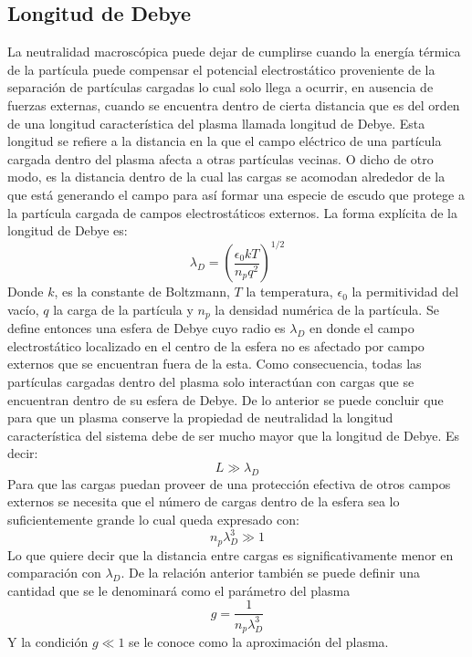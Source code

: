 \documentclass[../tesis_main_file.tex]{subfiles}
\begin{document}
\subsection{Longitud de Debye}
La neutralidad macroscópica puede dejar de cumplirse cuando la energía térmica de la partícula puede compensar el potencial electrostático proveniente de la separación de partículas cargadas lo cual solo llega a ocurrir, en ausencia de fuerzas externas, cuando se encuentra dentro de cierta distancia que es del orden de una longitud característica del plasma llamada longitud de Debye.
Esta longitud se refiere a la distancia en la que el campo eléctrico de una partícula cargada dentro del plasma afecta a otras partículas vecinas.
O dicho de otro modo, es la distancia dentro de la cual las cargas se acomodan alrededor de la que está generando el campo para así formar una especie de escudo que protege a la partícula cargada de campos electrostáticos externos.
La forma explícita de la longitud de Debye es:
\begin{equation}
\lambda_D = \left( \frac{\epsilon_0 k T}{n_p q^2} \right)^{1/2}
\end{equation}
Donde $k$, es la constante de Boltzmann, $T$ la temperatura, $\epsilon_0$ la permitividad del vacío, $q$ la carga de la partícula y $n_p$ la densidad numérica de la partícula.
Se define entonces una esfera de Debye cuyo radio es $\lambda_D$ en donde el campo electrostático localizado en el centro de la esfera no es afectado por campo externos que se encuentran fuera de la esta.
Como consecuencia, todas las partículas cargadas dentro del plasma solo interactúan con cargas que se encuentran dentro de su esfera de Debye.
De lo anterior se puede concluir que para que un plasma conserve la propiedad de neutralidad la longitud característica del sistema debe de ser mucho mayor que la longitud de Debye. Es decir:
\begin{equation}
L \gg \lambda_D
\end{equation}
Para que las cargas puedan proveer de una protección efectiva de otros campos externos se necesita que el número de cargas dentro de la esfera sea lo suficientemente grande lo cual queda expresado con:
\begin{equation}
n_p \lambda_D^3 \gg 1
\end{equation}
Lo que quiere decir que la distancia entre cargas es significativamente menor en comparación con $\lambda_D$. De la relación anterior también se puede definir una cantidad que se le denominará como el parámetro del plasma
\begin{equation}
g= \frac{1}{n_p \lambda_D^3}
\end{equation}
Y la condición $g \ll 1$ se le conoce como la aproximación del plasma.
\end{document}
